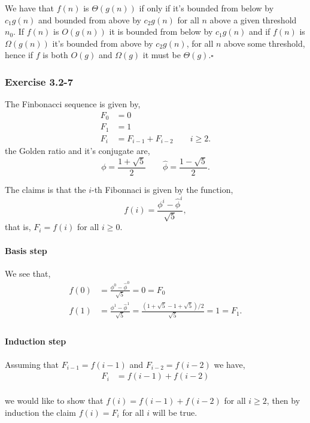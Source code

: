 \documentclass{article}
\begin{document}
We have that $f(n)$ is $\Theta(g(n))$ if only if it's bounded from below by $c_1g(n)$ and bounded from above by $c_2g(n)$ for all $n$ above a given threshold $n_0$. If $f(n)$ is $O(g(n))$ it is bounded from below by $c_1g(n)$ and if $f(n)$ is $\Omega(g(n))$ it's bounded from above by $c_2g(n)$, for all $n$ above some threshold, hence if $f$ is both $O(g)$ and $\Omega(g)$ it must be $\Theta(g)$.$\square$

\subsubsection*{Exercise 3.2-7}

The Finbonacci sequence is given by,
\begin{align*}
F_0 &= 0\\
F_1 &= 1\\
F_i &= F_{i-1} + F_{i-2}\qquad i\geq 2.
\end{align*}
the Golden ratio and it's conjugate are,
\[
\phi = \frac{1+\sqrt{5}}{2}\qquad\hat{\phi} = \frac{1-\sqrt{5}}{2}.
\]

The claims is that the $i$-th Fibonnaci is given by the function,
\begin{equation} \label{eq:fibclosedform}
f(i) = \frac{\phi^i-\hat{\phi}^i}{\sqrt{5}},
\end{equation}
that is, $F_i = f(i)$ for all $i\geq0$.
\paragraph{Basis step}
We see that,
\begin{align*}
f(0) &= \frac{\phi^0-\hat{\phi}^0}{\sqrt{5}} = 0 = F_0\\
f(1) &= \frac{\phi^1-\hat{\phi}^1}{\sqrt{5}} = \frac{(1+\sqrt{5}-1+\sqrt{5})/2}{\sqrt{5}} = 1 = F_1.\\
\end{align*}


\paragraph{Induction step} Assuming that $F_{i-1}=f(i-1)$ and $F_{i-2}=f(i-2)$ we have,
\begin{align*}
F_i &= f(i-1)+ f(i-2)\\
\end{align*}

we would like to show that $f(i)=f(i-1) + f(i-2)$ for all $i\geq2$, then by induction the claim $f(i) = F_i$ for all $i$ will be true.
\end{document}
